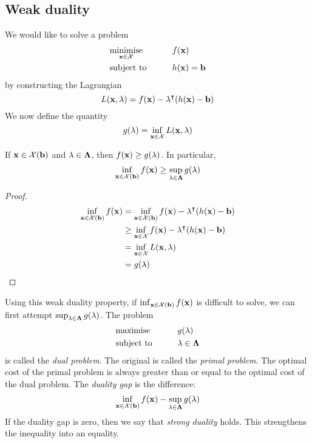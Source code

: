 \subsection{Weak duality}
We would like to solve a problem
\begin{alignat*}{2}
	 & \underset{\vb x \in \mathcal X}{\text{minimise}} & \qquad & f(\vb x)         \\
	 & \text{subject to}                                &        & h(\vb x) = \vb b
\end{alignat*}
by constructing the Lagrangian
\[
	L(\vb x, \vb \lambda) = f(\vb x) - \vb\lambda^\intercal (h(\vb x) - \vb b)
\]
We now define the quantity
\[
	g(\vb \lambda) = \inf_{\vb x \in \mathcal X} L(\vb x, \vb \lambda)
\]
\begin{theorem}
	If \( \vb x \in \mathcal X(\vb b) \) and \( \vb\lambda \in \vb\Lambda \), then \( f(\vb x) \geq g(\lambda) \).
	In particular,
	\[
		\inf_{\vb x \in \mathcal X(\vb b)} f(\vb x) \geq \sup_{\vb \lambda \in \vb \Lambda} g(\vb \lambda)
	\]
\end{theorem}
\begin{proof}
	\begin{align*}
		\inf_{\vb x \in \mathcal X(\vb b)} f(\vb x) & = \inf_{\vb x \in \mathcal X(\vb b)} f(\vb x) - \vb \lambda^\intercal (h(\vb x) - \vb b) \\
		                                            & \geq \inf_{\vb x \in \mathcal X} f(\vb x) - \vb \lambda^\intercal (h(\vb x) - \vb b)     \\
		                                            & = \inf_{\vb x \in \mathcal X} L(\vb x, \vb \lambda)                                       \\
		                                            & = g(\vb\lambda)
	\end{align*}
\end{proof}
Using this weak duality property, if \( \inf_{\vb x \in \mathcal X(\vb b)} f(\vb x) \) is difficult to solve, we can first attempt \( \sup_{\vb \lambda \in \vb \Lambda} g(\vb \lambda) \).
The problem
\begin{alignat*}{2}
	 & \text{maximise}   & \qquad & g(\vb \lambda)              \\
	 & \text{subject to} &        & \vb \lambda \in \vb \Lambda
\end{alignat*}
is called the \textit{dual problem}.
The original is called the \textit{primal problem}.
The optimal cost of the primal problem is always greater than or equal to the optimal cost of the dual problem.
The \textit{duality gap} is the difference:
\[
	\inf_{\vb x \in \mathcal X(\vb b)} f(\vb x) - \sup_{\vb \lambda \in \vb \Lambda} g(\vb \lambda)
\]
If the duality gap is zero, then we say that \textit{strong duality} holds.
This strengthens the inequality into an equality.

